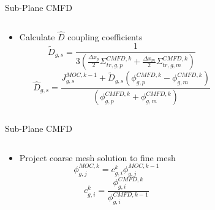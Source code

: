 \begin{frame}[t]{Sub-Plane CMFD}

\begin{columns}
  \begin{column}{0.6\textwidth}
    \begin{itemize}
      \item Calculate $\hat{D}$ coupling coefficients
      \begin{equation*}\scriptstyle
      \tilde{D}_{g,s} = \frac{1}{3\left(\frac{\Delta 
      x_p}{2}\Sigma_{tr,g,p}^{CMFD,k} + \frac{\Delta 
      x_m}{2}\Sigma_{tr,g,m}^{CMFD,k}\right)}
      \end{equation*}
      \begin{equation*}\scriptstyle
      \hat{D}_{g,s} = \frac{J_{g,s}^{MOC,k-1} + 
      \tilde{D}_{g,s}\left(\phi_{g,p}^{CMFD,k} - 
      \phi_{g,m}^{CMFD,k}\right)}{\left(\phi_{g,p}^{CMFD,k} + 
      \phi_{g,m}^{CMFD,k}\right)}
      \end{equation*}
    \end{itemize}
  \end{column}
  \begin{column}{0.4\textwidth}
    \begin{figure}[h]
      \centering
      \resizebox{!}{0.7\textheight}{}
    \end{figure}
  \end{column}
\end{columns}

\end{frame}


\begin{frame}[t]{Sub-Plane CMFD}

\begin{columns}
  \begin{column}{0.6\textwidth}
    \begin{itemize}
      \item Project coarse mesh solution to fine mesh
      \begin{equation*}\scriptstyle
      \phi_{g,j}^{MOC,k} = c_{g,i}^k \phi_{g,j}^{MOC,k-1}
      \end{equation*}
      \begin{equation*}\scriptstyle
      c_{g,i}^k = \frac{\phi_{g,i}^{CMFD,k}}{\phi_{g,i}^{CMFD,k-1}}
      \end{equation*}
    \end{itemize}
  \end{column}
  \begin{column}{0.4\textwidth}
    \begin{figure}[h]
      \centering
      \resizebox{!}{0.7\textheight}{}
    \end{figure}
  \end{column}
\end{columns}

\end{frame}

